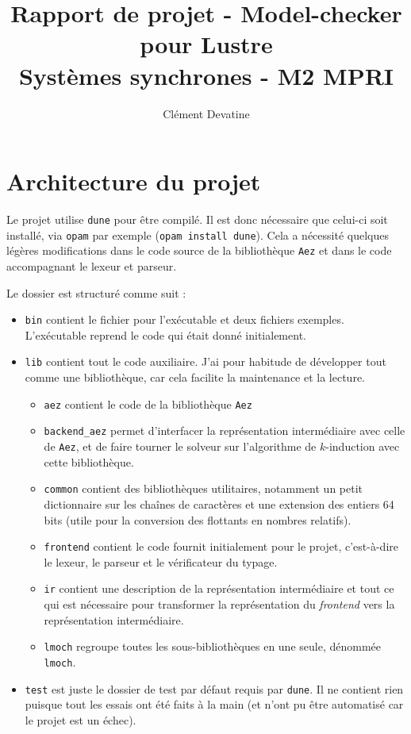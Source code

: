 \documentclass{article}
\title{Rapport de projet - Model-checker pour Lustre \\ Systèmes synchrones - M2 MPRI}
\author{Clément Devatine}
\begin{document}
\maketitle

\section{Architecture du projet}

Le projet utilise \texttt{dune} pour être compilé. Il est donc nécessaire que celui-ci soit installé, via \texttt{opam} par exemple (\texttt{opam install dune}).
Cela a nécessité quelques légères modifications dans le code source de la bibliothèque \texttt{Aez} et dans le code accompagnant le lexeur et parseur.

\noindent
Le dossier est structuré comme suit :
\begin{itemize}
	\item \texttt{bin} contient le fichier pour l'exécutable et deux fichiers exemples. L'exécutable reprend le code qui était donné initialement.
	\item \texttt{lib} contient tout le code auxiliaire. J'ai pour habitude de développer tout comme une bibliothèque, car cela facilite la maintenance et la lecture.
	\begin{itemize}
		\item \texttt{aez} contient le code de la bibliothèque \texttt{Aez}
		\item \texttt{backend\_aez} permet d'interfacer la représentation intermédiaire avec celle de \texttt{Aez}, et de faire tourner le solveur sur l'algorithme de \(k\)-induction avec cette bibliothèque.
		\item \texttt{common} contient des bibliothèques utilitaires, notamment un petit dictionnaire sur les chaînes de caractères et une extension des entiers 64 bits (utile pour la conversion des flottants en nombres relatifs).
		\item \texttt{frontend} contient le code fournit initialement pour le projet, c'est-à-dire le lexeur, le parseur et le vérificateur du typage.
		\item \texttt{ir} contient une description de la représentation intermédiaire et tout ce qui est nécessaire pour transformer la représentation du \textit{frontend} vers la représentation intermédiaire.
		\item \texttt{lmoch} regroupe toutes les sous-bibliothèques en une seule, dénommée \texttt{lmoch}.
	\end{itemize}
	\item \texttt{test} est juste le dossier de test par défaut requis par \texttt{dune}. Il ne contient rien puisque tout les essais ont été faits à la main (et n'ont pu être automatisé car le projet est un échec).
\end{itemize}
\end{document}
